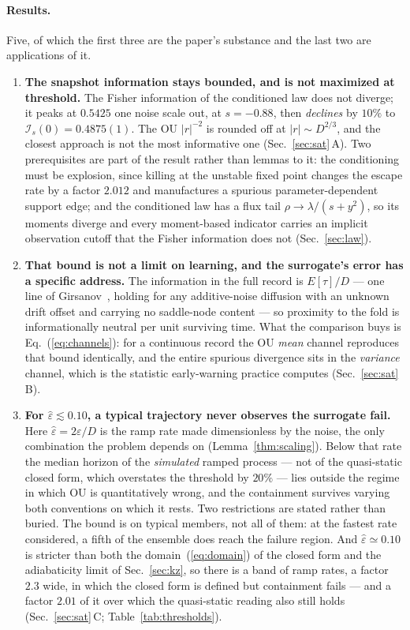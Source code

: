 \documentclass[%
 aip,
 cha,
 amsmath,amssymb,
 reprint,
 superscriptaddress,
 floatfix,
]{revtex4-2}
\newcommand{\Ifish}{\mathcal{I}}
\newcommand{\Sig}{\hat\varepsilon}
\begin{document}
\paragraph{Results.}
Five, of which the first three are the paper's substance and the last two are applications of it.
\begin{enumerate}

\item \textbf{The snapshot information stays bounded, and is not maximized at threshold.}  The Fisher information of the conditioned law does not diverge; it peaks at $0.5425$ one noise scale out, at $s=-0.88$, then \emph{declines} by $10\%$ to $\Ifish_s(0)=0.4875(1)$.  The OU $|r|^{-2}$ is rounded off at $|r|\sim D^{2/3}$, and the closest approach is not the most informative one (Sec.~\ref{sec:sat}\,A).  Two prerequisites are part of the result rather than lemmas to it: the conditioning must be explosion, since killing at the unstable fixed point changes the escape rate by a factor $2.012$ and manufactures a spurious parameter-dependent support edge; and the conditioned law has a flux tail $\rho\to\lambda/(s+y^2)$, so its moments diverge and every moment-based indicator carries an implicit observation cutoff that the Fisher information does not (Sec.~\ref{sec:law}).

\item \textbf{That bound is not a limit on learning, and the surrogate's error has a specific address.}  The information in the full record is $E[\tau]/D$ --- one line of Girsanov~\cite{LiptserShiryaev2001b}, holding for any additive-noise diffusion with an unknown drift offset and carrying no saddle-node content --- so proximity to the fold is informationally neutral per unit surviving time.  What the comparison buys is Eq.~(\ref{eq:channels}): for a continuous record the OU \emph{mean} channel reproduces that bound identically, and the entire spurious divergence sits in the \emph{variance} channel, which is the statistic early-warning practice computes (Sec.~\ref{sec:sat}\,B).

\item \textbf{For $\Sig\lesssim0.10$, a typical trajectory never observes the surrogate fail.}  Here $\Sig=2\varepsilon/D$ is the ramp rate made dimensionless by the noise, the only combination the problem depends on (Lemma~\ref{thm:scaling}).  Below that rate the median horizon of the \emph{simulated} ramped process --- not of the quasi-static closed form, which overstates the threshold by $20\%$ --- lies outside the regime in which OU is quantitatively wrong, and the containment survives varying both conventions on which it rests.  Two restrictions are stated rather than buried.  The bound is on typical members, not all of them: at the fastest rate considered, a fifth of the ensemble does reach the failure region.  And $\Sig\simeq0.10$ is stricter than both the domain~(\ref{eq:domain}) of the closed form and the adiabaticity limit of Sec.~\ref{sec:kz}, so there is a band of ramp rates, a factor $2.3$ wide, in which the closed form is defined but containment fails --- and a factor $2.01$ of it over which the quasi-static reading also still holds (Sec.~\ref{sec:sat}\,C; Table~\ref{tab:thresholds}).


\end{enumerate}
\end{document}
